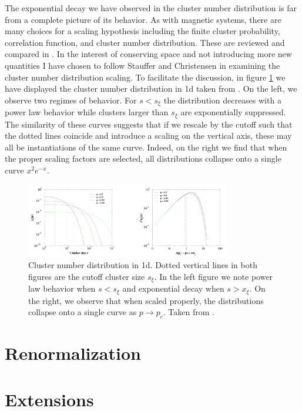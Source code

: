 The exponential decay we have observed in the cluster number distribution is far
from a complete picture of its behavior. As with magnetic systems, there are many
choices for a scaling hypothesis including the finite cluster probability, correlation
function, and cluster number distribution.  These are reviewed and compared in
\cite{Essam1980}. In the interest of conserving space and not introducing
more new quantities I have chosen to follow Stauffer and Christensen in examining
the cluster number distribution scaling. To facilitate the discussion, in figure
\ref{fig:cluster_num_1d} we have displayed the cluster number distribution in 1d
taken from \cite{Christensen2002}.  On the left, we observe two regimes of behavior.
For $s<s_\xi$ the distribution decreases with a power law behavior while clusters
larger than $s_\xi$ are exponentially suppressed. The similarity of these curves
suggests that if we rescale by the cutoff such that the dotted lines coincide
and introduce a scaling on the vertical axis, these may all be instantiations
of the same curve.  Indeed, on the right we find that when the proper scaling
factors are selected, all distributions collapse onto a single curve $x^2 e^{-x}$.
\begin{figure}[h]
  \centering
    \includegraphics[width=0.8\textwidth]{cluster_num_1d_christensen}
  \caption{Cluster number distribution in 1d.  Dotted vertical lines in both
           figures are the cutoff cluster size $s_\xi$.  In the left figure we note
           power law behavior when $s<s_\xi$ and exponential decay when $s>x_\xi$.
           On the right, we observe that when scaled properly, the distributions 
           collapse onto a single curve as $p\to p_c$.
           Taken from \cite{Christensen2002}.}
  \label{fig:cluster_num_1d}
\end{figure}


\section{Renormalization}
\section{Extensions}


